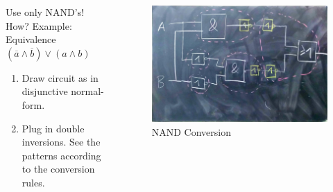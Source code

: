 \documentclass{beamer}
\begin{document}
\begin{frame}
  \begin{columns}
  \begin{column}{5cm}
  Use only NAND's! How?
    \newline Example: Equivalence
  \newline
  $(\overline{a}\land \overline{b})\lor(a\land b)$
  \newline
  \begin{enumerate}
   \item Draw circuit as in disjunctive normal-form.
   \item Plug in double inversions. See the patterns according to the conversion rules.
  \end{enumerate}

  \end{column}
  
  \begin{column}{6cm}
    \begin{figure}[H]
      \centering
      \includegraphics[width=1\textwidth]{eq2}%
      \caption{NAND Conversion}%
      \label{fig:equivalence_optimized}
    \end{figure}
  \end{column}
  \end{columns}  
\end{frame}
\end{document}
